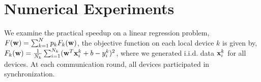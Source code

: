 


\section{Numerical Experiments}



We examine the practical speedup on a linear regression problem, 
$ F({\mathbf{w}}) = \sum_{k=1}^N p_kF_k({\mathbf{w}})$, the objective function on each local device $k$ is given by, $F_k({\mathbf{w}}) = \frac{1}{N_k} \sum_{i=1}^{N_k} ({\mathbf{w}}^T{\mathbf{x}}_i^k + b  - y_i^k)^2$, where we generated i.i.d. data ${\mathbf{x}}_i^k$ for all devices. At each communication round, all devices participated
in synchronization. 

